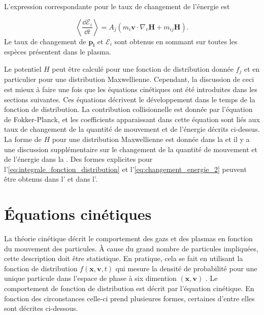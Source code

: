 \documentclass[main.tex]{subfiles}
\begin{document}
L'expression correspondante pour le taux de changement de l'énergie est

\begin{equation}
	\left\langle \frac{\dd \mathscr{E}_i}{\dd t} \right\rangle = A_j \left( m_i \bm{v} \cdot \nabla_v \bm{H} + m_{ij} \bm{H}\right).
	\label{eq:changement_energie_2}
\end{equation}
Le taux de changement de \( \bm{p_i} \) et \( \mathscr{E}_i \) sont obtenus en sommant sur toutes les espèces présentent dans le plasma.

Le potentiel \( H \) peut être calculé pour une fonction de distribution  donnée \( f_j \) et en particulier pour une distribution Maxwellienne.
Cependant, la discussion de ceci est mieux à faire une fois que les équations cinétiques ont été introduites dans les sections suivantes.
Ces équations décrivent le développement dans le temps de la fonction de distribution.
La contribution collisionnelle est donnée par l'équation de Fokker-Planck, et les coefficients apparaissant dans cette équation sont liés aux taux de changement de la quantité de mouvement et de l'énergie décrits ci-dessus.
La forme de \( H \) pour une distribution Maxwellienne est donnée dans la \color{red}{Section 2.13 (lien à rajouter quand elle sera faite)}\color{black} et il y a une discussion supplémentaire sur le changement de la quantité de mouvement et de l'énergie dans la  \color{red}{Section 2.14 (lien à rajouter quand elle sera faite)}\color{black}.
Des formes explicites pour l'\autoref{eq:integrale_fonction_distribution} et l'\autoref{eq:changement_energie_2} peuvent être obtenus dans l'\color{red}{équation 2.13.1 (lien à rajouter quand elle sera faite)}\color{black} et dans l'\color{red}{équation 2.13.4 (lien à rajouter quand elle sera faite)}\color{black}.

\section{Équations cinétiques}

La théorie cinétique décrit le comportement des gazs et des plasmas en fonction du mouvement des particules.
À cause du grand nombre de particules impliquées, cette description doit être statistique.
En pratique, cela se fait en utilisant la fonction de distribution \( f \left( \bm{x}, \bm{v}, t \right) \) qui mesure la densité de probabilité pour une unique particule dans l'espace de phase à six dimention \( \left( \bm{x}, \bm{v} \right) \) .
Le comportement de fonction de distribution est décrit par l'équation cinétique.
En fonction des circonstances celle-ci prend plusieures formes, certaines d'entre elles sont décrites ci-dessous.
\end{document}

